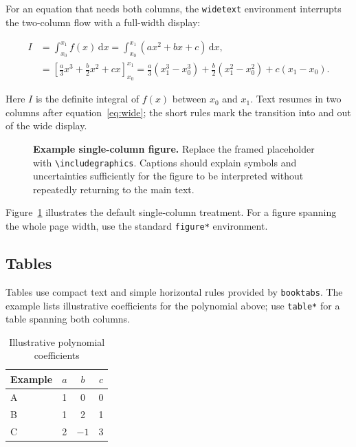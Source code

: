 \documentclass[10pt,a4paper,twocolumn]{article}
\begin{document}
For an equation that needs both columns, the \texttt{widetext} environment
interrupts the two-column flow with a full-width display:
\begin{widetext}
  \begin{equation}
    \label{eq:wide}
    \begin{aligned}
      I &= \int_{x_0}^{x_1} f(x)\,\mathrm{d}x
      = \int_{x_0}^{x_1} \left(ax^2 + bx + c\right)\,\mathrm{d}x,\\
      &= \left[\frac{a}{3}x^3 + \frac{b}{2}x^2 + cx\right]_{x_0}^{x_1}
      = \frac{a}{3}\left(x_1^3-x_0^3\right)
      + \frac{b}{2}\left(x_1^2-x_0^2\right) + c\left(x_1-x_0\right).
    \end{aligned}
  \end{equation}
\end{widetext}
Here $I$ is the definite integral of $f(x)$ between $x_0$ and $x_1$.
Text resumes in two columns after equation~\ref{eq:wide}; the short rules
mark the transition into and out of the wide display.

\begin{figure}[t]
  \centering
  \fbox{\rule{0pt}{35mm}\rule{0.94\columnwidth}{0pt}}
  \caption{\textbf{Example single-column figure.} Replace the framed placeholder with \texttt{\textbackslash includegraphics}. Captions should explain symbols and uncertainties sufficiently for the figure to be interpreted without repeatedly returning to the main text.}
  \label{fig:example}
\end{figure}

Figure~\ref{fig:example} illustrates the default single-column treatment. For a figure spanning the whole page width, use the standard \texttt{figure*} environment.

\subsection{Tables}
Tables use compact text and simple horizontal rules provided by \texttt{booktabs}. The example lists illustrative coefficients for the polynomial above; use \texttt{table*} for a table spanning both columns.
\begin{table}[t]
  \caption{Illustrative polynomial coefficients}
  \centering
  \begin{tabular}{lccc}
    \toprule
    Example & $a$ & $b$ & $c$ \\
    \midrule
    A & 1 & 0 & 0 \\
    B & 1 & 2 & 1 \\
    C & 2 & $-1$ & 3 \\
    \bottomrule
  \end{tabular}
\end{table}
\end{document}
